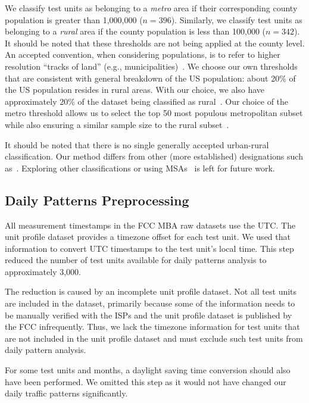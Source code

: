 \documentclass[conference,10pt]{IEEEtran}
\begin{document}
We classify test units as belonging to a \emph{metro} area if their corresponding county population is greater than 1,000,000 ($n=396$). Similarly, we classify test units as belonging to a \emph{rural} area if the county population is less than 100,000 ($n=342$). It should be noted that these thresholds are not being applied at the county level. An accepted convention, when considering populations, is to refer to higher resolution ``tracks of land'' (e.g., municipalities)~\cite{censusMSA}. We choose our own thresholds that are consistent with general breakdown of the \gls{US} population: about 20\% of the \gls{US} population resides in rural areas. With our choice, we also have approximately 20\% of the dataset being classified as rural~\cite{metroRural}. Our choice of the metro threshold allows us to select the top 50 most populous metropolitan subset while also ensuring a similar sample size to the rural subset~\cite{censusMSA}.

It should be noted that there is no single generally accepted urban-rural classification. Our method differs from other (more established) designations such as~\cite{rural-classifications}. Exploring other classifications or using \glspl{MSA}~\cite{msa} is left for future work.

\subsection{Daily Patterns Preprocessing}

All measurement timestamps in the \gls{FCC} \gls{MBA} raw datasets use the \gls{UTC}. The unit profile dataset provides a timezone offset for each test unit. We used that information to convert \gls{UTC} timestamps to the test unit's local time. This step reduced the number of test units available for daily patterns analysis to approximately 3,000.

The reduction is caused by an incomplete unit profile dataset. Not all test units are included in the dataset, primarily because some of the information needs to be manually verified with the \glspl{ISP} and the unit profile dataset is published by the \gls{FCC} infrequently. Thus, we lack the timezone information for test units that are not included in the unit profile dataset and must exclude such test units from daily pattern analysis.

For some test units and months, a daylight saving time conversion should also have been performed. We omitted this step as it would not have changed our daily traffic patterns significantly.
\end{document}
